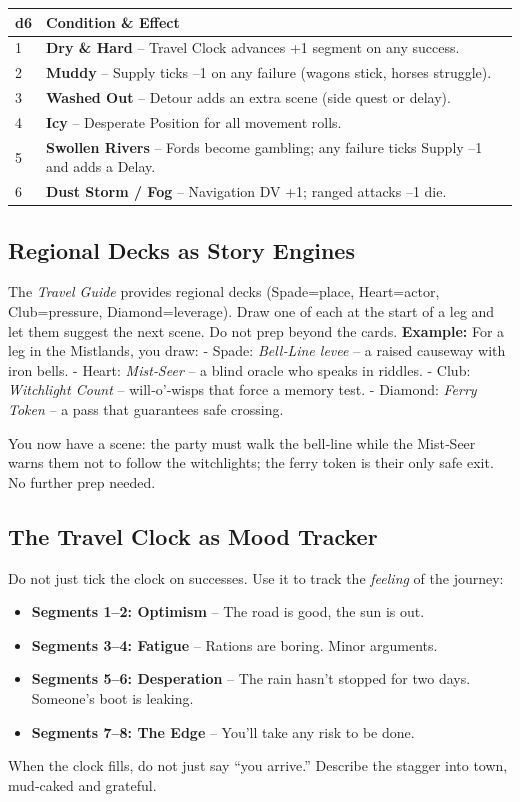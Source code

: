 \begin{fatebox}
  \begin{tabularx}{\textwidth}{lX}
    \toprule
    \textbf{d6} & \textbf{Condition \& Effect} \\
    \midrule
    1 & \textbf{Dry \& Hard} – Travel Clock advances +1 segment on any success. \\
    2 & \textbf{Muddy} – Supply ticks –1 on any failure (wagons stick, horses struggle). \\
    3 & \textbf{Washed Out} – Detour adds an extra scene (side quest or delay). \\
    4 & \textbf{Icy} – Desperate Position for all movement rolls. \\
    5 & \textbf{Swollen Rivers} – Fords become gambling; any failure ticks Supply –1 and adds a Delay. \\
    6 & \textbf{Dust Storm / Fog} – Navigation DV +1; ranged attacks –1 die. \\
    \bottomrule
  \end{tabularx}
\end{fatebox}

\subsection{Regional Decks as Story Engines}
The \textit{Travel Guide} provides regional decks (Spade=place, Heart=actor, Club=pressure, Diamond=leverage). Draw one of each at the start of a leg and let them suggest the next scene. Do not prep beyond the cards.  
\textbf{Example:} For a leg in the Mistlands, you draw:  
- Spade: \textit{Bell‑Line levee} – a raised causeway with iron bells.  
- Heart: \textit{Mist‑Seer} – a blind oracle who speaks in riddles.  
- Club: \textit{Witchlight Count} – will‑o’‑wisps that force a memory test.  
- Diamond: \textit{Ferry Token} – a pass that guarantees safe crossing.  

You now have a scene: the party must walk the bell‑line while the Mist‑Seer warns them not to follow the witchlights; the ferry token is their only safe exit. No further prep needed.

\subsection{The Travel Clock as Mood Tracker}
Do not just tick the clock on successes. Use it to track the \emph{feeling} of the journey:
\begin{itemize}
  \item \textbf{Segments 1–2: Optimism} – The road is good, the sun is out.
  \item \textbf{Segments 3–4: Fatigue} – Rations are boring. Minor arguments.
  \item \textbf{Segments 5–6: Desperation} – The rain hasn’t stopped for two days. Someone’s boot is leaking.
  \item \textbf{Segments 7–8: The Edge} – You’ll take any risk to be done.
\end{itemize}
When the clock fills, do not just say “you arrive.” Describe the stagger into town, mud‑caked and grateful.

